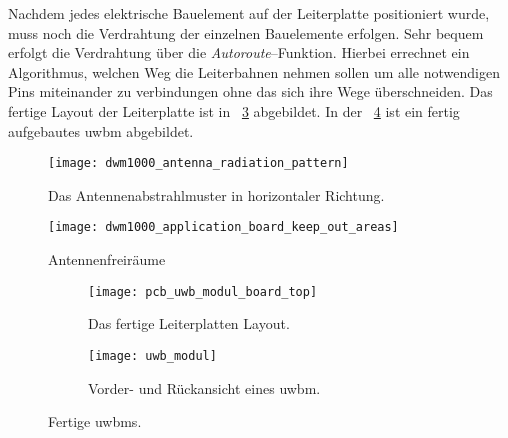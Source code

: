 Nachdem jedes elektrische Bauelement auf der Leiterplatte positioniert wurde, muss noch die Verdrahtung der einzelnen Bauelemente erfolgen. Sehr bequem erfolgt die Verdrahtung über die \textit{Autoroute}--Funktion. Hierbei errechnet ein Algorithmus, welchen Weg die Leiterbahnen nehmen sollen um alle notwendigen Pins miteinander zu verbindungen ohne das sich ihre Wege überschneiden. Das fertige Layout der Leiterplatte ist in \figurename~\ref{fig:pcb_uwb_modul_board_top} abgebildet. In der \figurename~\ref{fig:uwb_modul} ist ein fertig aufgebautes \gls{uwbm} abgebildet.

\begin{figure}
	\centering
	\texttt{[image: dwm1000\_antenna\_radiation\_pattern]}
	\caption{Das Antennenabstrahlmuster in horizontaler Richtung.}
	\label{fig:dwm1000_antenna_radiation_pattern}
\end{figure}
	
\begin{figure}
	\centering
	\texttt{[image: dwm1000\_application\_board\_keep\_out\_areas]}
	\caption{Antennenfreiräume}
	\label{fig:dwm1000_application_board_keep_out_areas}
\end{figure}

%

\begin{figure}
	\begin{subfigure}[t]{0.3\textwidth}
		\texttt{[image: pcb\_uwb\_modul\_board\_top]}
		\caption{Das fertige Leiterplatten Layout.}
		\label{fig:pcb_uwb_modul_board_top}
	\end{subfigure}
	\hfill
	\begin{subfigure}[t]{0.6\textwidth}
		\centering
		\texttt{[image: uwb\_modul]}
		\caption{Vorder- und Rückansicht eines \gls{uwbm}.}
		\label{fig:uwb_modul}
	\end{subfigure}
	\caption{Fertige \glspl{uwbm}.}
	\label{fig:fertige_uwb_module}
\end{figure}





